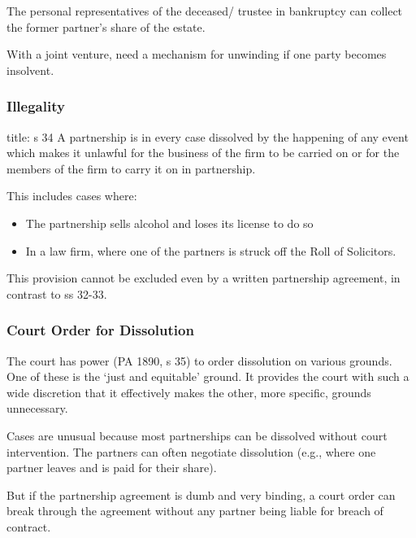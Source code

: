 \documentclass[
]{article}
\newenvironment{Shaded}{}{}
\newcommand{\NormalTok}[1]{#1}
\providecommand{\tightlist}{%
  \setlength{\itemsep}{0pt}\setlength{\parskip}{0pt}}
\begin{document}
The personal representatives of the deceased/ trustee in bankruptcy can
collect the former partner's share of the estate.

With a joint venture, need a mechanism for unwinding if one party
becomes insolvent.

\hypertarget{illegality}{%
\subsubsection{Illegality}\label{illegality}}

\begin{Shaded}
\begin{Highlighting}[]
\NormalTok{title: s 34}
\NormalTok{A partnership is in every case dissolved by the happening of any event which makes it unlawful for the business of the firm to be carried on or for the members of the firm to carry it on in partnership. }
\end{Highlighting}
\end{Shaded}

This includes cases where:

\begin{itemize}
\tightlist
\item
  The partnership sells alcohol and loses its license to do so
\item
  In a law firm, where one of the partners is struck off the Roll of
  Solicitors.
\end{itemize}

This provision cannot be excluded even by a written partnership
agreement, in contrast to ss 32-33.

\hypertarget{court-order-for-dissolution}{%
\subsubsection{Court Order for
Dissolution}\label{court-order-for-dissolution}}

The court has power (PA 1890, s 35) to order dissolution on various
grounds. One of these is the `just and equitable' ground. It provides
the court with such a wide discretion that it effectively makes the
other, more specific, grounds unnecessary.

Cases are unusual because most partnerships can be dissolved without
court intervention. The partners can often negotiate dissolution (e.g.,
where one partner leaves and is paid for their share).

But if the partnership agreement is dumb and very binding, a court order
can break through the agreement without any partner being liable for
breach of contract.
\end{document}
